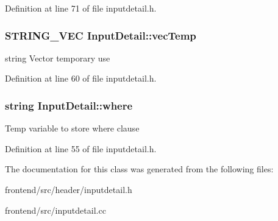 \-Definition at line 71 of file inputdetail.\-h.

\hypertarget{classInputDetail_abee6a659eb2e34b260aaf8b05d6003b4}{
\subsubsection[{vec\-Temp}]{\setlength{\rightskip}{0pt plus 5cm}\-S\-T\-R\-I\-N\-G\-\_\-\-V\-E\-C {\bf \-Input\-Detail\-::vec\-Temp}}}\label{db/d6e/classInputDetail_abee6a659eb2e34b260aaf8b05d6003b4}
string \-Vector temporary use 

\-Definition at line 60 of file inputdetail.\-h.

\hypertarget{classInputDetail_a79d8a59940f25f4d2089e241c71a4279}{
\subsubsection[{where}]{\setlength{\rightskip}{0pt plus 5cm}string {\bf \-Input\-Detail\-::where}}}\label{db/d6e/classInputDetail_a79d8a59940f25f4d2089e241c71a4279}
\-Temp variable to store where clause 

\-Definition at line 55 of file inputdetail.\-h.



\-The documentation for this class was generated from the following files\-:\begin{DoxyCompactItemize}
\item 
frontend/src/header/inputdetail.\-h\item 
frontend/src/inputdetail.\-cc\end{DoxyCompactItemize}

